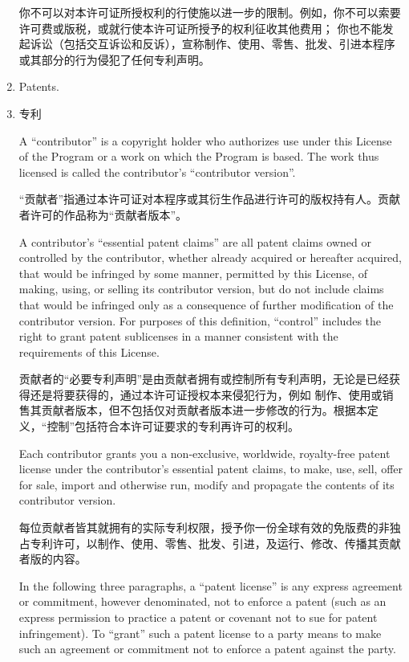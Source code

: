 \documentclass[11pt]{article}
\begin{document}
\begin{enumerate}
        你不可以对本许可证所授权利的行使施以进一步的限制。例如，你不可以索要许可费或版税，或就行使本许可证所授予的权利征收其他费用；
        你也不能发起诉讼（包括交互诉讼和反诉），宣称制作、使用、零售、批发、引进本程序或其部分的行为侵犯了任何专利声明。

  \item Patents.
  \item 专利

        A ``contributor'' is a copyright holder who authorizes use under this
        License of the Program or a work on which the Program is based.  The
        work thus licensed is called the contributor's ``contributor version''.

        “贡献者”指通过本许可证对本程序或其衍生作品进行许可的版权持有人。贡献者许可的作品称为“贡献者版本”。

        A contributor's ``essential patent claims'' are all patent claims
        owned or controlled by the contributor, whether already acquired or
        hereafter acquired, that would be infringed by some manner, permitted
        by this License, of making, using, or selling its contributor version,
        but do not include claims that would be infringed only as a
        consequence of further modification of the contributor version.  For
        purposes of this definition, ``control'' includes the right to grant
        patent sublicenses in a manner consistent with the requirements of
        this License.

        贡献者的“必要专利声明”是由贡献者拥有或控制所有专利声明，无论是已经获得还是将要获得的，通过本许可证授权本来侵犯行为，例如
        制作、使用或销售其贡献者版本，但不包括仅对贡献者版本进一步修改的行为。根据本定义，“控制”包括符合本许可证要求的专利再许可的权利。

        Each contributor grants you a non-exclusive, worldwide, royalty-free
        patent license under the contributor's essential patent claims, to
        make, use, sell, offer for sale, import and otherwise run, modify and
        propagate the contents of its contributor version.

        每位贡献者皆其就拥有的实际专利权限，授予你一份全球有效的免版费的非独占专利许可，以制作、使用、零售、批发、引进，及运行、修改、传播其贡献者版的内容。

        In the following three paragraphs, a ``patent license'' is any express
        agreement or commitment, however denominated, not to enforce a patent
        (such as an express permission to practice a patent or covenant not to
        sue for patent infringement).  To ``grant'' such a patent license to a
        party means to make such an agreement or commitment not to enforce a
        patent against the party.


\end{enumerate}
\end{document}
